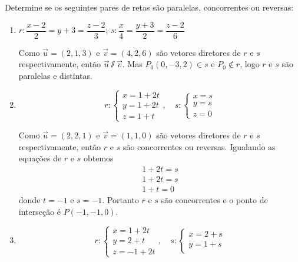 \begin{exemplos}
    Determine se os seguintes pares de retas são paralelas, concorrentes ou reversas:
    \begin{enumerate}
        \item $r: \dfrac{x - 2}{2} = y + 3 = \dfrac{z - 2}{3}$; $s:\dfrac{x}{4} = \dfrac{y+3}{2} = \dfrac{z-2}{6}$
        \begin{solucao}
            Como $\vec{u} = (2,1,3)$ e $\vec{v} = (4,2,6)$ são vetores diretores de $r$ e $s$ respectivamente, então $\vec{u}\varparallel\vec{v}$. Mas $P_0(0,-3,2)\in s$ e $P_0\notin r$, logo $r$ e $s$ são paralelas e distintas.
        \end{solucao}
        \item
        \[
            r: \begin{cases}
                x = 1 + 2t\\
                y = 1 + 2t\\
                z = 1 + t
            \end{cases},\quad s: \begin{cases}
                x = s\\
                y = s\\
                z = 0
            \end{cases}
        \]
        \begin{solucao}
            Como $\vec{u} = (2,2,1)$ e $\vec{v} = (1,1,0)$ são vetores diretores de $r$ e $s$ respectivamente, então $r$ e $s$ são concorrentes ou reversas. Igualando as equações de $r$ e $s$ obtemos
            \begin{align*}
                1 + 2t = s\\
                1 + 2t = s\\
                1 + t = 0
            \end{align*}
            donde $t = -1$ e $s = -1$. Portanto $r$ e $s$ são concorrentes e o ponto de interseção é $P(-1,-1,0)$.
        \end{solucao}
        \item
        \[
            r: \begin{cases}
                x = 1 + 2t\\
                y = 2 + t\\
                z = -1 + 2t
            \end{cases},\quad s: \begin{cases}
                x = 2 + s\\
                y = 1 + s\\

\end{cases}\]
\end{enumerate}
\end{exemplos}
